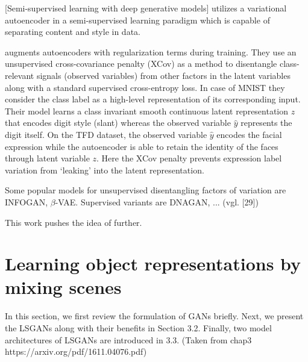 \documentclass[11pt,a4paper]{article}
\begin{document}
[Semi-supervised learning with deep generative models] utilizes a variational autoencoder in a semi-supervised learning paradigm which is capable of separating content and style in data.

\par\cite{1412.6583} augments autoencoders with regularization terms during training. They use an unsupervised cross-covariance penalty (XCov) as a method to disentangle class-relevant signals (observed variables) from other factors in the latent variables along with a standard supervised cross-entropy loss. In case of MNIST they consider the class label as a high-level representation of its corresponding input. Their model learns a class invariant smooth continuous latent representation $z$ that encodes digit style (slant) whereas the observed variable $\hat{y}$ represents the digit itself. On the TFD dataset, the observed variable $\hat{y}$ encodes the facial expression while the autoencoder is able to retain the identity of the faces through latent variable $z$. Here the XCov penalty prevents expression label variation from ‘leaking’ into the latent representation.

\par Some popular models for unsupervised disentangling factors of variation are INFOGAN, $\beta$-VAE. Supervised variants are DNAGAN, ... (vgl. [29]) 

\par This work pushes the idea of \cite{1711.07410} further.

\section{Learning object representations by mixing scenes}
In this section, we first review the formulation of GANs briefly. Next, we present the LSGANs along with their benefits in Section 3.2. Finally, two model architectures of LSGANs are introduced in 3.3. (Taken from chap3 https://arxiv.org/pdf/1611.04076.pdf)
\end{document}
